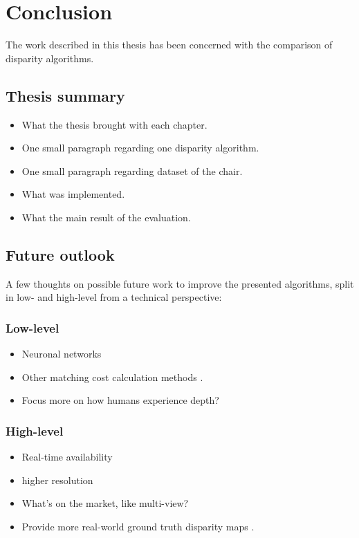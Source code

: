 \chapter{Conclusion}
\label{chap:conclusion}

The work described in this thesis has been concerned with the comparison of disparity algorithms.

\section{Thesis summary}

\begin{itemize}
  \item What the thesis brought with each chapter.
  \item One small paragraph regarding one disparity algorithm.
  \item One small paragraph regarding dataset of the chair.
  \item What was implemented.
  \item What the main result of the evaluation.
\end{itemize}

\newpage

\section{Future outlook}

A few thoughts on possible future work to improve the presented algorithms, split in low- and high-level from a technical perspective:

\subsection*{Low-level}

\begin{itemize}
  \item Neuronal networks \citep{olshausen1996emergence}
  \item Other matching cost calculation methods \citep{hermann2010gradient}.
  \item Focus more on how humans experience depth? \citep{deangelis1995neuronal}
\end{itemize}

\subsection*{High-level}

\begin{itemize}
  \item Real-time availability
  \item higher resolution
  \item What's on the market, like multi-view?
  \item Provide more real-world ground truth disparity maps \citep{kondermann2015stereo, Geiger2011IV}.
\end{itemize}
